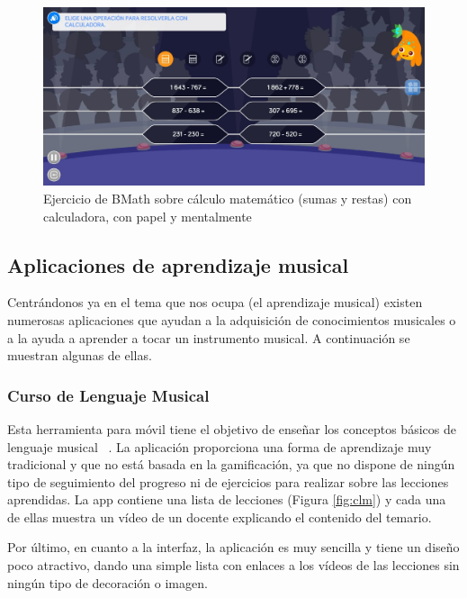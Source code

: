\begin{figure}[H]
    \centering
    \includegraphics[width=\textwidth]{imagenes/c2/bmath2.jpeg}
    \caption{Ejercicio de BMath sobre cálculo matemático (sumas y restas) con calculadora, con papel y mentalmente}
    \label{fig:bmath2}

\end{figure}


\newpage

\subsection{Aplicaciones de aprendizaje musical}
Centrándonos ya en el tema que nos ocupa (el aprendizaje musical) existen numerosas aplicaciones que ayudan a la adquisición
de conocimientos musicales o a la ayuda a aprender a tocar un instrumento musical. A continuación se muestran algunas de ellas.


\subsubsection{Curso de Lenguaje Musical}
Esta herramienta para móvil tiene el objetivo de enseñar los conceptos básicos de lenguaje musical ~\cite{curlenmusi}. La aplicación proporciona una forma de aprendizaje muy 
tradicional y que no está basada en la gamificación, ya que no dispone de ningún tipo de seguimiento del progreso ni de ejercicios para realizar sobre las lecciones aprendidas.
La app contiene una lista de lecciones (Figura \ref{fig:clm}) y cada una de ellas muestra un vídeo de un docente explicando el contenido del temario. 

Por último, en cuanto a la interfaz, la aplicación es muy sencilla y tiene un diseño poco atractivo, dando una simple lista con enlaces
a los vídeos de las lecciones sin ningún tipo de decoración o imagen.

